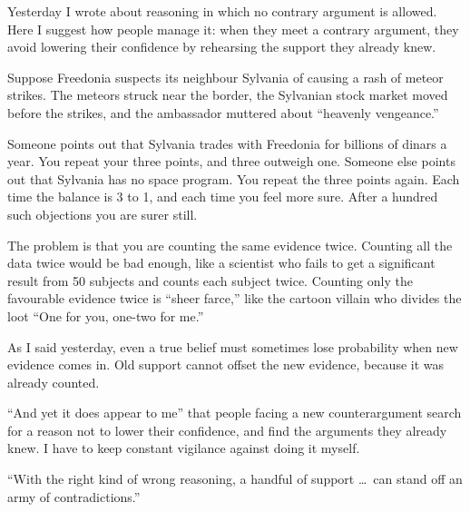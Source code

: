 
Yesterday I wrote about reasoning in which no contrary argument is allowed. Here I suggest how people manage it: when they meet a contrary argument, they avoid lowering their confidence by rehearsing the support they already knew.

Suppose Freedonia suspects its neighbour Sylvania of causing a rash of meteor strikes.  The meteors struck near the border, the Sylvanian stock market moved before the strikes, and the ambassador muttered about ``heavenly vengeance.''

Someone points out that Sylvania trades with Freedonia for billions of dinars a year. You repeat your three points, and three outweigh one. Someone else points out that Sylvania has no space program. You repeat the three points again. Each time the balance is 3 to 1, and each time you feel more sure. After a hundred such objections you are surer still.

The problem is that you are counting the same evidence twice. Counting all the data twice would be bad enough, like a scientist who fails to get a significant result from 50 subjects and counts each subject twice. Counting only the favourable evidence twice is ``sheer farce,'' like the cartoon villain who divides the loot ``One for you, one-two for me.''

As I said yesterday, even a true belief must sometimes lose probability when new evidence comes in. Old support cannot offset the new evidence, because it was already counted.

``And yet it does appear to me'' that people facing a new counterargument search for a reason not to lower their confidence, and find the arguments they already knew.  I have to keep constant vigilance against doing it myself.

``With the right kind of wrong reasoning, a handful of support \ldots\ can stand off an army of contradictions.''
